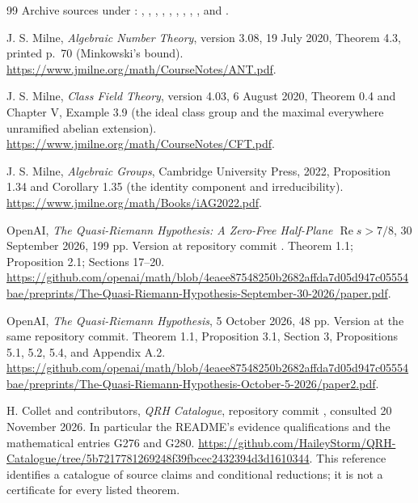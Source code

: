 \documentclass[11pt,a4paper]{article}
\theoremstyle{remark}
\begin{document}
\begin{thebibliography}{99}
Archive sources under
:
,
,
,
,
,
,
,
,
, and
.

J. S. Milne, \emph{Algebraic Number Theory}, version 3.08,
19 July 2020, Theorem 4.3, printed p.~70 (Minkowski's bound).
\url{https://www.jmilne.org/math/CourseNotes/ANT.pdf}.

J. S. Milne, \emph{Class Field Theory}, version 4.03,
6 August 2020, Theorem 0.4 and Chapter V, Example 3.9
(the ideal class group and the maximal everywhere unramified
abelian extension).
\url{https://www.jmilne.org/math/CourseNotes/CFT.pdf}.

J. S. Milne, \emph{Algebraic Groups}, Cambridge University Press,
2022, Proposition 1.34 and Corollary 1.35
(the identity component and irreducibility).
\url{https://www.jmilne.org/math/Books/iAG2022.pdf}.


OpenAI, \emph{The Quasi-Riemann Hypothesis: A Zero-Free Half-Plane
$\operatorname{Re}s>7/8$}, 30 September 2026, 199 pp.
Version at repository commit
.
Theorem 1.1; Proposition 2.1; Sections 17--20.
\url{https://github.com/openai/math/blob/4eaee87548250b2682affda7d05d947c05554bae/preprints/The-Quasi-Riemann-Hypothesis-September-30-2026/paper.pdf}.

OpenAI, \emph{The Quasi-Riemann Hypothesis}, 5 October 2026,
48 pp. Version at the same repository commit.
Theorem 1.1, Proposition 3.1, Section 3, Propositions 5.1, 5.2,
5.4, and Appendix A.2.
\url{https://github.com/openai/math/blob/4eaee87548250b2682affda7d05d947c05554bae/preprints/The-Quasi-Riemann-Hypothesis-October-5-2026/paper2.pdf}.

H. Collet and contributors, \emph{QRH Catalogue}, repository
commit ,
consulted 20 November 2026. In particular the README's evidence
qualifications and the mathematical entries G276 and G280.
\url{https://github.com/HaileyStorm/QRH-Catalogue/tree/5b7217781269248f39fbcec2432394d3d1610344}.
This reference identifies a catalogue of source claims and
conditional reductions; it is not a certificate for every
listed theorem.


\end{thebibliography}
\end{document}
